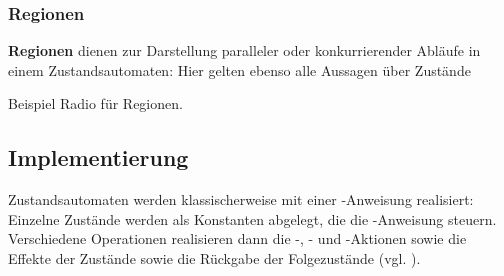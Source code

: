 \subsubsection*{Regionen}
\textbf{Regionen} dienen zur Darstellung paralleler oder konkurrierender Abläufe in einem Zustandsautomaten: Hier gelten ebenso alle Aussagen über Zustände


\begin{tcolorbox}[colback=yellow!20]
    Beispiel Radio für Regionen.
\end{tcolorbox}

\subsection{Implementierung}
Zustandsautomaten werden klassischerweise mit einer -Anweisung realisiert: Einzelne Zustände werden als Konstanten abgelegt, die die -Anweisung steuern.\\
Verschiedene Operationen realisieren dann die -, - und -Aktionen sowie die Effekte der Zustände sowie die Rückgabe der Folgezustände (vgl. \cite[75]{Buh09}).
